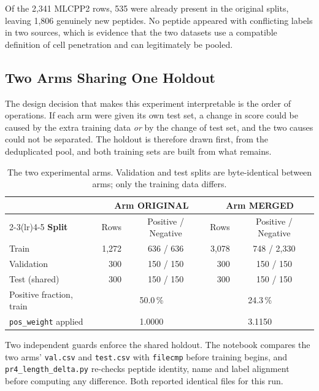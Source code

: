 \documentclass[11pt,a4paper]{article}
\newcommand{\code}[1]{\texttt{\small #1}}
\begin{document}
Of the 2{,}341 MLCPP2 rows, 535 were already present in the original splits, leaving 1{,}806 genuinely
new peptides. No peptide appeared with conflicting labels in two sources, which is evidence that the two
datasets use a compatible definition of cell penetration and can legitimately be pooled.

\subsection{Two Arms Sharing One Holdout}
The design decision that makes this experiment interpretable is the order of operations. If each arm were
given its own test set, a change in score could be caused by the extra training data \emph{or} by the
change of test set, and the two causes could not be separated. The holdout is therefore drawn first, from
the deduplicated pool, and both training sets are built from what remains.

\begin{table}[h]
\centering\small
\begin{tabular}{@{}lrcrc@{}}
\toprule
& \multicolumn{2}{c}{\sffamily\bfseries\color{navy}Arm ORIGINAL} & \multicolumn{2}{c}{\sffamily\bfseries\color{navy}Arm MERGED}\\
\cmidrule(lr){2-3}\cmidrule(lr){4-5}
\sffamily\bfseries\color{navy}Split & Rows & Positive / Negative & Rows & Positive / Negative\\
\midrule
Train               & 1{,}272 & 636 / 636 & 3{,}078 & 748 / 2{,}330\\
Validation          &    300 & 150 / 150 &    300 & 150 / 150\\
Test (shared)       &    300 & 150 / 150 &    300 & 150 / 150\\
\midrule
Positive fraction, train & \multicolumn{2}{c}{50.0\,\%} & \multicolumn{2}{c}{24.3\,\%}\\
\code{pos\_weight} applied & \multicolumn{2}{c}{1.0000} & \multicolumn{2}{c}{3.1150}\\
\bottomrule
\end{tabular}
\caption{The two experimental arms. Validation and test splits are byte-identical between arms; only the
training data differs.}
\end{table}

Two independent guards enforce the shared holdout. The notebook compares the two arms' \code{val.csv} and
\code{test.csv} with \code{filecmp} before training begins, and \code{pr4\_length\_delta.py} re-checks
peptide identity, name and label alignment before computing any difference. Both reported identical files
for this run.
\end{document}
